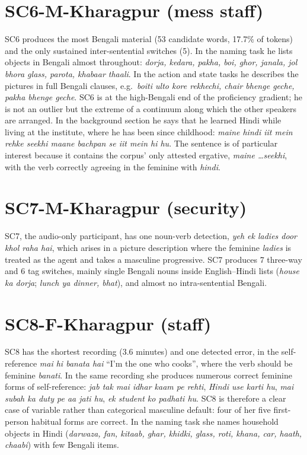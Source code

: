 \documentclass[11pt,a4paper]{report}
\begin{document}
\section{SC6-M-Kharagpur (mess staff)}

SC6 produces the most Bengali material (53 candidate words, 17.7\% of tokens) and the only sustained inter-sentential switches (5). In the naming task he lists objects in Bengali almost throughout: \textit{dorja, kedara, pakha, boi, ghor, janala, jol bhora glass, parota, khabaar thaali}. In the action and state tasks he describes the pictures in full Bengali clauses, e.g.\ \textit{boiti ulto kore rekhechi, chair bhenge geche, pakha bhenge geche}. SC6 is at the high-Bengali end of the proficiency gradient; he is not an outlier but the extreme of a continuum along which the other speakers are arranged. In the background section he says that he learned Hindi while living at the institute, where he has been since childhood: \textit{maine hindi iit mein rehke seekhi maane bachpan se iit mein hi hu}. The sentence is of particular interest because it contains the corpus' only attested ergative, \textit{maine \ldots seekhi}, with the verb correctly agreeing in the feminine with \textit{hindi}.

\section{SC7-M-Kharagpur (security)}

SC7, the audio-only participant, has one noun-verb detection, \textit{yeh ek ladies door khol raha hai}, which arises in a picture description where the feminine \textit{ladies} is treated as the agent and takes a masculine progressive. SC7 produces 7 three-way and 6 tag switches, mainly single Bengali nouns inside English--Hindi lists (\textit{house ka dorja}; \textit{lunch ya dinner, bhat}), and almost no intra-sentential Bengali.

\section{SC8-F-Kharagpur (staff)}

SC8 has the shortest recording (3.6 minutes) and one detected error, in the self-reference \textit{mai hi banata hai} ``I'm the one who cooks'', where the verb should be feminine \textit{banati}. In the same recording she produces numerous correct feminine forms of self-reference: \textit{jab tak mai idhar kaam pe rehti}, \textit{Hindi use karti hu}, \textit{mai subah ka duty pe aa jati hu}, \textit{ek student ko padhati hu}. SC8 is therefore a clear case of variable rather than categorical masculine default: four of her five first-person habitual forms are correct. In the naming task she names household objects in Hindi (\textit{darwaza, fan, kitaab, ghar, khidki, glass, roti, khana, car, haath, chaabi}) with few Bengali items.
\end{document}
